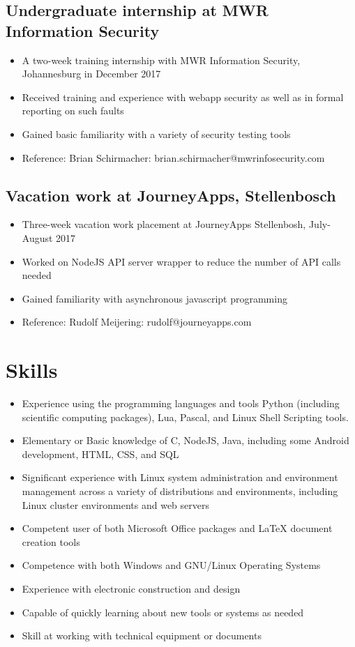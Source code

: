\documentclass[12pt,a4paper,notitlepage]{article}
\begin{document}
\subsection*{Undergraduate internship at MWR Information Security}
\begin{itemize}
	\setlength\itemsep{0.02em}
    \item A two-week training internship with MWR Information Security, Johannesburg in December 2017
    \item Received training and experience with webapp security as well as in formal reporting on such faults
    \item Gained basic familiarity with a variety of security testing tools
    \item Reference: Brian Schirmacher: brian.schirmacher@mwrinfosecurity.com
\end{itemize}

\subsection*{Vacation work at JourneyApps, Stellenbosch}
\begin{itemize}
	\setlength\itemsep{0.02em}
    \item Three-week vacation work placement at JourneyApps Stellenbosh, July-August 2017
    \item Worked on NodeJS API server wrapper to reduce the number of API calls needed
    \item Gained familiarity with asynchronous javascript programming
    \item Reference: Rudolf Meijering: rudolf@journeyapps.com
\end{itemize}

\section*{Skills}
\begin{itemize}
	\setlength\itemsep{0.02em}
    \item Experience using the programming languages and tools Python (including scientific computing packages), Lua, Pascal, and Linux Shell Scripting tools.
    \item Elementary or Basic knowledge of C, NodeJS, Java, including some Android development, HTML, CSS, and SQL
    \item Significant experience with Linux system administration and environment management across a variety of distributions and environments, including Linux cluster environments and web servers
    \item Competent user of both Microsoft Office packages and LaTeX document creation tools
    \item Competence with both Windows and GNU/Linux Operating Systems
    \item Experience with electronic construction and design
    \item Capable of quickly learning about new tools or systems as needed
    \item Skill at working with technical equipment or documents
\end{itemize}
\end{document}
